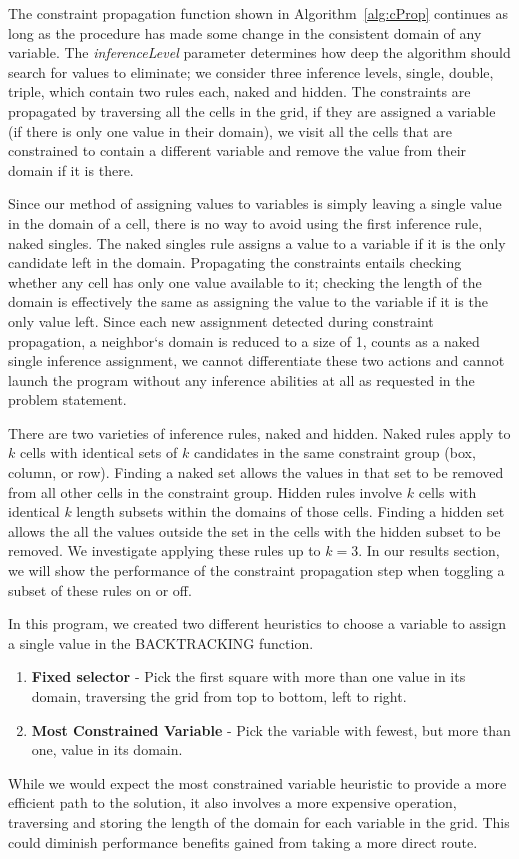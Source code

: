 The constraint propagation function shown in Algorithm~\ref{alg:cProp} continues as long as the procedure has made some change in the consistent domain of any variable.
The \textit{inferenceLevel} parameter determines how deep the algorithm should search for values to eliminate; we consider three inference levels, single, double, triple, which contain two rules each, naked and hidden.
The constraints are propagated by traversing all the cells in the grid, if they are assigned a variable (if there is only one value in their domain), we visit all the cells that are constrained to contain a different variable and remove the value from their domain if it is there.

Since our method of assigning values to variables is simply leaving a single value in the domain of a cell, there is no way to avoid using the first inference rule, naked singles.  
The naked singles rule assigns a value to a variable if it is the only candidate left in the domain.
Propagating the constraints entails checking whether any cell has only one value available to it; checking the length of the domain is effectively the same as assigning the value to the variable if it is the only value left. 
Since each new assignment detected during constraint propagation, a neighbor`s domain is reduced to a size of 1, counts as a naked single inference assignment, we cannot differentiate these two actions and cannot launch the program without any inference abilities at all as requested in the problem statement.

There are two varieties of inference rules, naked and hidden. 
Naked rules apply to $k$ cells with identical sets of $k$ candidates in the same constraint group (box, column, or row).
Finding a naked set allows the values in that set to be removed from all other cells in the constraint group.
Hidden rules involve $k$ cells with identical $k$ length subsets within the domains of those cells.
Finding a hidden set allows the all the values outside the set in the cells with the hidden subset to be removed. 
We investigate applying these rules up to $k=3$. 
In our results section, we will show the performance of the constraint propagation step when toggling a subset of these rules on or off.

In this program, we created two different heuristics to choose a variable to assign a single value in the BACKTRACKING function.
\begin{enumerate}
\item \textbf{Fixed selector} - Pick the first square with more than one value in its domain, traversing the grid from top to bottom, left to right.
\item \textbf{Most Constrained Variable} - Pick the variable with fewest, but more than one, value in its domain.
\end{enumerate}
While we would expect the most constrained variable heuristic to provide a more efficient path to the solution, it also involves a more expensive operation, traversing and storing the length of the domain for each variable in the grid.
This could diminish performance benefits gained from taking a more direct route.



